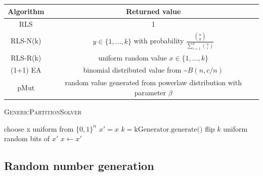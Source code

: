 \begin{tabular}{c c}
      Algorithm & Returned value                                                                          \\
      \hline
      RLS       & 1                                                                                       \\
      RLS-N(k)  & $y \in \{1,\dots,k\}$ with probability $\frac{\binom{n}{y}}{\sum_{i=1}^k \binom{n}{i}}$ \\
      RLS-R(k)  & uniform random value $x \in \{1,\dots,k\}$                                              \\
      (1+1) EA  & binomial distributed value from \textasciitilde$B(n,c/n)$                               \\
      pMut      & random value generated from powerlaw distribution with parameter $\beta$                \\
\end{tabular}



\begin{algorithm}[bt]
      \caption{\textsc{GenericPartitionSolver}}\label{alg:genericPartition}

      \DontPrintSemicolon %

      \BlankLine
      choose x uniform from ${\{0,1\}}^n$\;
      {
      $x' = x$\;
      $k = \text{kGenerator.generate()}$\;
      flip $k$ uniform random bits of $x'$\;
      {
      {
            $x \leftarrow x'$\;
      }
      }
      }
\end{algorithm}

\subsection{Random number generation}


